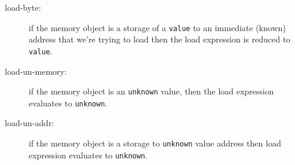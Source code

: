 \documentclass[11pt]{article}
\begin{document}
\begin{description}
\item[load-byte:] if the memory object is a storage of a \verb|value|
  to an immediate (known) address that we're trying to load then the
  load expression is reduced to \verb|value|.
\item[load-un-memory:] if the memory object is an \verb|unknown| value,
  then the load expression evaluates to \verb|unknown|.
\item[load-un-addr:] if the memory object is a storage to
  \verb|unknown| value address then load expression evaluates to
  \verb|unknown|.
\end{description}

\ottdefnsreduceXXexp

\ottdefnshelpers
\end{document}
